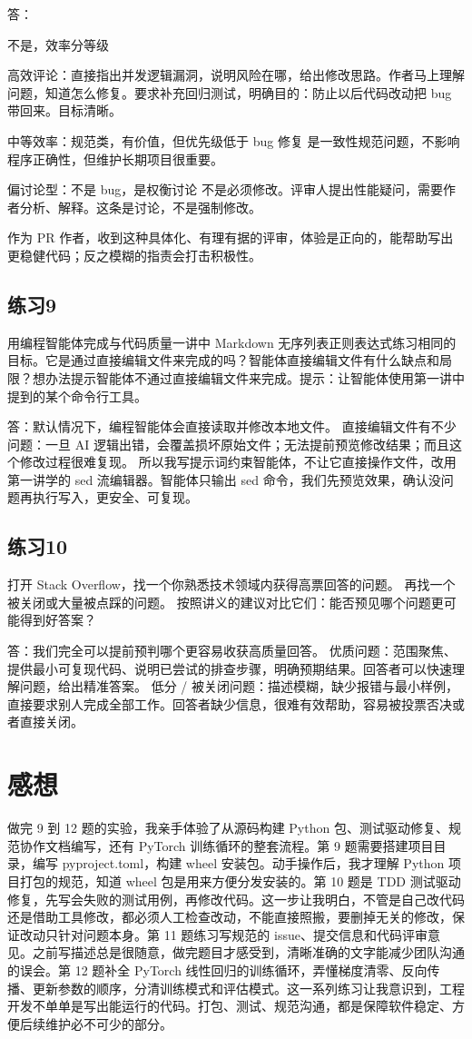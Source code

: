 \documentclass[11pt,a4paper]{ctexart}
\begin{document}
答：

不是，效率分等级

高效评论：直接指出并发逻辑漏洞，说明风险在哪，给出修改思路。作者马上理解问题，知道怎么修复。要求补充回归测试，明确目的：防止以后代码改动把 bug 带回来。目标清晰。

中等效率：规范类，有价值，但优先级低于 bug 修复 是一致性规范问题，不影响程序正确性，但维护长期项目很重要。

偏讨论型：不是 bug，是权衡讨论 不是必须修改。评审人提出性能疑问，需要作者分析、解释。这条是讨论，不是强制修改。

作为 PR 作者，收到这种具体化、有理有据的评审，体验是正向的，能帮助写出更稳健代码；反之模糊的指责会打击积极性。

\subsection*{练习9}
用编程智能体完成与代码质量一讲中 Markdown 无序列表正则表达式练习相同的目标。它是通过直接编辑文件来完成的吗？智能体直接编辑文件有什么缺点和局限？想办法提示智能体不通过直接编辑文件来完成。提示：让智能体使用第一讲中提到的某个命令行工具。

答：默认情况下，编程智能体会直接读取并修改本地文件。 直接编辑文件有不少问题：一旦 AI 逻辑出错，会覆盖损坏原始文件；无法提前预览修改结果；而且这个修改过程很难复现。 所以我写提示词约束智能体，不让它直接操作文件，改用第一讲学的 sed 流编辑器。智能体只输出 sed 命令，我们先预览效果，确认没问题再执行写入，更安全、可复现。

\subsection*{练习10}
打开 Stack Overflow，找一个你熟悉技术领域内获得高票回答的问题。 再找一个被关闭或大量被点踩的问题。 按照讲义的建议对比它们：能否预见哪个问题更可能得到好答案？

答：我们完全可以提前预判哪个更容易收获高质量回答。 优质问题：范围聚焦、提供最小可复现代码、说明已尝试的排查步骤，明确预期结果。回答者可以快速理解问题，给出精准答案。 低分 / 被关闭问题：描述模糊，缺少报错与最小样例，直接要求别人完成全部工作。回答者缺少信息，很难有效帮助，容易被投票否决或者直接关闭。

\section*{感想}
做完 9 到 12 题的实验，我亲手体验了从源码构建 Python 包、测试驱动修复、规范协作文档编写，还有 PyTorch 训练循环的整套流程。第 9 题需要搭建项目目录，编写 pyproject.toml，构建 wheel 安装包。动手操作后，我才理解 Python 项目打包的规范，知道 wheel 包是用来方便分发安装的。第 10 题是 TDD 测试驱动修复，先写会失败的测试用例，再修改代码。这一步让我明白，不管是自己改代码还是借助工具修改，都必须人工检查改动，不能直接照搬，要删掉无关的修改，保证改动只针对问题本身。第 11 题练习写规范的 issue、提交信息和代码评审意见。之前写描述总是很随意，做完题目才感受到，清晰准确的文字能减少团队沟通的误会。第 12 题补全 PyTorch 线性回归的训练循环，弄懂梯度清零、反向传播、更新参数的顺序，分清训练模式和评估模式。这一系列练习让我意识到，工程开发不单单是写出能运行的代码。打包、测试、规范沟通，都是保障软件稳定、方便后续维护必不可少的部分。
\end{document}
